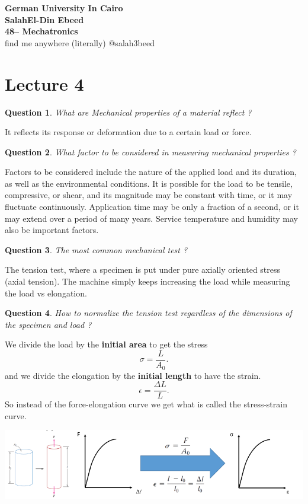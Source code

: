 \documentclass[13]{article}
\newtheorem{exer}{Question}
\begin{document}
{\LARGE \textbf{German University In Cairo
	\\ SalahEl-Din Ebeed 
	\\ 48-- Mechatronics
}
\\}  find me anywhere (literally) @salah3beed

\section{Lecture 4}
\begin{exer}
What are Mechanical properties of a material reflect ?
\end{exer}

It reflects its response or deformation due to a certain load or force.
\begin{exer}
What factor to be considered in measuring mechanical properties ?
\end{exer}
Factors to be considered include the nature of the applied load and its
duration, as well as the environmental conditions. It is possible for the
load to be tensile, compressive, or shear, and its magnitude may be constant
with time, or it may fluctuate continuously.  Application time may be only a
fraction of a second, or it may extend over a period of many years. Service
temperature and humidity may also be important factors.
\begin{exer}
The most common mechanical test  ?
\end{exer}
The tension test, where a specimen is put under pure axially oriented stress (axial tension). The machine simply keeps increasing the load while measuring the load vs elongation. 
\begin{exer}
How to normalize the tension test regardless of the dimensions of the specimen and load ?
\end{exer}
We divide the load by the \textbf{initial area}  to get the stress
\[
\sigma = \frac{L}{A_0} 
.\] 
and we divide the elongation by the \textbf{initial length }to have the strain. 
\[
\epsilon = \frac{\Delta L}{L} 
.\] 
So instead of the force-elongation curve we get what is called the stress-strain curve.
\\
\begin{center}
\includegraphics[scale=0.5]{figures/1.png}
\end{center}
\end{document}
